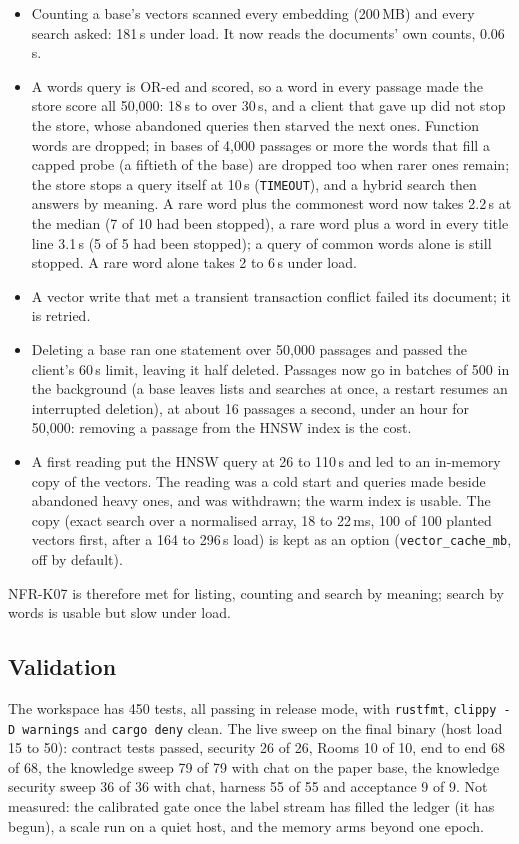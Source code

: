 \begin{itemize}
\item Counting a base's vectors scanned every embedding (200\,MB) and every search asked: 181\,s under load. It now reads the documents' own counts, 0.06\,s.
\item A words query is OR-ed and scored, so a word in every passage made the store score all 50,000: 18\,s to over 30\,s, and a client that gave up did not stop the
  store, whose abandoned queries then starved the next ones. Function words are dropped; in bases of 4,000 passages or more the words that fill a capped probe (a fiftieth
  of the base) are dropped too when rarer ones remain; the store stops a query itself at 10\,s (\texttt{TIMEOUT}), and a hybrid search then answers by meaning. A rare
  word plus the commonest word now takes 2.2\,s at the median (7 of 10 had been stopped), a rare word plus a word in every title line 3.1\,s (5 of 5 had been
  stopped); a query of common words alone is still stopped. A rare word alone takes 2 to 6\,s under load.
\item A vector write that met a transient transaction conflict failed its document; it is retried.
\item Deleting a base ran one statement over 50,000 passages and passed the client's 60\,s limit, leaving it half deleted. Passages now go in batches of 500 in the
  background (a base leaves lists and searches at once, a restart resumes an interrupted deletion), at about 16 passages a second, under an hour for 50,000: removing a
  passage from the HNSW index is the cost.
\item A first reading put the HNSW query at 26 to 110\,s and led to an in-memory copy of the vectors. The reading was a cold start and queries made beside abandoned
  heavy ones, and was withdrawn; the warm index is usable. The copy (exact search over a normalised array, 18 to 22\,ms, 100 of 100 planted vectors first, after a
  164 to 296\,s load) is kept as an option (\texttt{vector\_cache\_mb}, off by default).
\end{itemize}

NFR-K07 is therefore met for listing, counting and search by meaning; search by words is usable but slow under load.

\subsection{Validation}

The workspace has 450 tests, all passing in release mode, with \texttt{rustfmt}, \texttt{clippy -D warnings} and \texttt{cargo deny} clean. The live sweep on the final
binary (host load 15 to 50): contract tests passed, security 26 of 26, Rooms 10 of 10, end to end 68 of 68, the knowledge sweep 79 of 79 with chat on the paper base,
the knowledge security sweep 36 of 36 with chat, harness 55 of 55 and acceptance 9 of 9. Not measured: the calibrated gate once the label stream has filled the ledger
(it has begun), a scale run on a quiet host, and the memory arms beyond one epoch.

